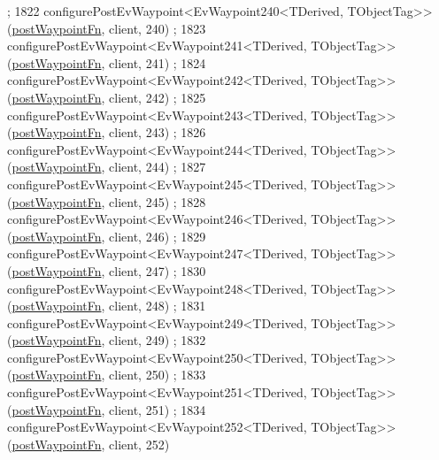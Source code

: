 \begin{DoxyCode}
      ;
1822     configurePostEvWaypoint<EvWaypoint240<TDerived, TObjectTag>>(\hyperlink{classmove__base__z__client_1_1WaypointEventDispatcher_acc538eb7506c13f7cca2268a1742dadd}{postWaypointFn}, client, 240)
      ;
1823     configurePostEvWaypoint<EvWaypoint241<TDerived, TObjectTag>>(\hyperlink{classmove__base__z__client_1_1WaypointEventDispatcher_acc538eb7506c13f7cca2268a1742dadd}{postWaypointFn}, client, 241)
      ;
1824     configurePostEvWaypoint<EvWaypoint242<TDerived, TObjectTag>>(\hyperlink{classmove__base__z__client_1_1WaypointEventDispatcher_acc538eb7506c13f7cca2268a1742dadd}{postWaypointFn}, client, 242)
      ;
1825     configurePostEvWaypoint<EvWaypoint243<TDerived, TObjectTag>>(\hyperlink{classmove__base__z__client_1_1WaypointEventDispatcher_acc538eb7506c13f7cca2268a1742dadd}{postWaypointFn}, client, 243)
      ;
1826     configurePostEvWaypoint<EvWaypoint244<TDerived, TObjectTag>>(\hyperlink{classmove__base__z__client_1_1WaypointEventDispatcher_acc538eb7506c13f7cca2268a1742dadd}{postWaypointFn}, client, 244)
      ;
1827     configurePostEvWaypoint<EvWaypoint245<TDerived, TObjectTag>>(\hyperlink{classmove__base__z__client_1_1WaypointEventDispatcher_acc538eb7506c13f7cca2268a1742dadd}{postWaypointFn}, client, 245)
      ;
1828     configurePostEvWaypoint<EvWaypoint246<TDerived, TObjectTag>>(\hyperlink{classmove__base__z__client_1_1WaypointEventDispatcher_acc538eb7506c13f7cca2268a1742dadd}{postWaypointFn}, client, 246)
      ;
1829     configurePostEvWaypoint<EvWaypoint247<TDerived, TObjectTag>>(\hyperlink{classmove__base__z__client_1_1WaypointEventDispatcher_acc538eb7506c13f7cca2268a1742dadd}{postWaypointFn}, client, 247)
      ;
1830     configurePostEvWaypoint<EvWaypoint248<TDerived, TObjectTag>>(\hyperlink{classmove__base__z__client_1_1WaypointEventDispatcher_acc538eb7506c13f7cca2268a1742dadd}{postWaypointFn}, client, 248)
      ;
1831     configurePostEvWaypoint<EvWaypoint249<TDerived, TObjectTag>>(\hyperlink{classmove__base__z__client_1_1WaypointEventDispatcher_acc538eb7506c13f7cca2268a1742dadd}{postWaypointFn}, client, 249)
      ;
1832     configurePostEvWaypoint<EvWaypoint250<TDerived, TObjectTag>>(\hyperlink{classmove__base__z__client_1_1WaypointEventDispatcher_acc538eb7506c13f7cca2268a1742dadd}{postWaypointFn}, client, 250)
      ;
1833     configurePostEvWaypoint<EvWaypoint251<TDerived, TObjectTag>>(\hyperlink{classmove__base__z__client_1_1WaypointEventDispatcher_acc538eb7506c13f7cca2268a1742dadd}{postWaypointFn}, client, 251)
      ;
1834     configurePostEvWaypoint<EvWaypoint252<TDerived, TObjectTag>>(\hyperlink{classmove__base__z__client_1_1WaypointEventDispatcher_acc538eb7506c13f7cca2268a1742dadd}{postWaypointFn}, client, 252)

\end{DoxyCode}
